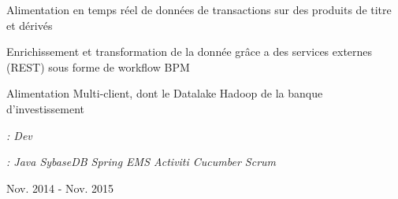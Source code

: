 \begin{cventries}
{\begin{cvsubentries}
{\begin{cvitems}
 \setlength\itemsep{0.5em}
	\item {Alimentation en temps réel de données de transactions sur des produits de titre et dérivés }
	\item {Enrichissement et transformation de la donnée grâce a des services externes (REST) sous forme de workflow BPM}
	\item {Alimentation Multi-client, dont le Datalake Hadoop de la banque d'investissement}
	\end{cvitems}
\begin{cvitemsnobullet}
 \setlength\itemsep{0.3em}
	\item {\textit{\scriptsize \color{awesome-sub}{Rôles}\color{text}: Dev}}
\item {\textit{\scriptsize \color{awesome-sub}{Env}\color{text}: 
Java{\enskip\cdotp\enskip}
SybaseDB{\enskip\cdotp\enskip}
Spring{\enskip\cdotp\enskip}
EMS{\enskip\cdotp\enskip}
Activiti{\enskip\cdotp\enskip}
Cucumber{\enskip\cdotp\enskip}
Scrum}}
\end{cvitemsnobullet}
}{Nov. 2014 - Nov. 2015}{}
\end{cvsubentries}}
\end{cventries}
